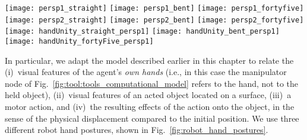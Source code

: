 \begin{figure*}
    \subfloat
    {\texttt{[image: persp1\_straight]} } \quad
    \subfloat
    {\texttt{[image: persp1\_bent]} } \quad
    \subfloat
    {\texttt{[image: persp1\_fortyfive]} } \\
    \subfloat
    {\texttt{[image: persp2\_straight]}  } \quad
    \subfloat
    {\texttt{[image: persp2\_bent]} } \quad
    \subfloat
    {\texttt{[image: persp2\_fortyfive]} } \\
    \subfloat
    {\texttt{[image: handUnity\_straight\_persp1]} } \quad
    \subfloat
    {\texttt{[image: handUnity\_bent\_persp1]} } \quad
    \subfloat
    {\texttt{[image: handUnity\_fortyFive\_persp1]}}
    \caption[The three robot hand postures adopted to study the hand to tool transition.]{The three robot hand postures adopted to study the hand to tool transition. Left column: straight hand; center column: bent hand; right column: arched hand. The first two rows are real robot postures seen from different viewpoints; the last row shows the simulated body schema CAD model of the top viewpoint. From the latter simulated view, we obtain the segmented silhouette contour of the hand and its shape features.}
    \label{fig:robot_hand_postures}
\end{figure*}

In particular, we adapt the model described earlier in this chapter to relate the
(i)~visual features of the agent's \emph{own hands} (i.e., in this case the manipulator node of Fig.~\ref{fig:tool:tools_computational_model} refers to the hand, not to the held object),
(ii)~visual features of an acted object located on a surface,
(iii)~a motor action, and
(iv)~the resulting effects of the action onto the object, in the sense of the physical displacement compared to the initial position.
We use three different robot hand postures, shown in Fig.~\ref{fig:robot_hand_postures}.

